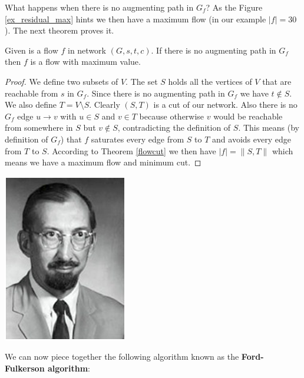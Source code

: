 What happens when there is no augmenting path in $G_f$? As the Figure \ref{ex_residual_max} hints we then have a maximum flow (in our example $|f| = 30$). The next theorem proves it.

\begin{thm}\label{no_augmenting}
Given is a flow $f$ in network $(G, s, t, c)$. If there is no augmenting path in $G_f$ then $f$ is a flow with maximum value.
\end{thm}

\begin{proof}
We define two subsets of $V$. The set $S$ holds all the vertices of $V$ that are reachable from $s$ in $G_f$. Since there is no augmenting path in $G_f$ we have $t \notin S$. We also define $T = V \setminus S$. Clearly $(S, T)$ is a cut of our network. Also there is no $G_f$ edge $u \rightarrow v$ with $u \in S$ and $v \in T$ because otherwise $v$ would be reachable from somewhere in $S$ but $v \notin S$, contradicting the definition of $S$. This means (by definition of $G_f$) that $f$ saturates every edge from $S$ to $T$ and avoids every edge from $T$ to $S$. According to Theorem \ref{flowcut} we then have $|f| = \|S, T\|$ which means we have a maximum flow and minimum cut.

\end{proof}

\begin{marginfigure}
\includegraphics[scale=0.8]{fulkerson.png}
\end{marginfigure}

We can now piece together the following algorithm known as the \textbf{Ford-Fulkerson algorithm}:

